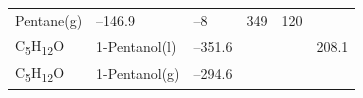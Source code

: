 \documentclass[
]{book}
\theoremstyle{definition}
\theoremstyle{definition}
\theoremstyle{definition}
\theoremstyle{remark}
\begin{document}
\begin{longtable}[]{@{}llllll@{}}
\begin{minipage}[t]{0.17\columnwidth}
Pentane(g)\strut
\end{minipage} & \begin{minipage}[t]{0.15\columnwidth}\raggedright
--146.9\strut
\end{minipage} & \begin{minipage}[t]{0.15\columnwidth}\raggedright
--8\strut
\end{minipage} & \begin{minipage}[t]{0.14\columnwidth}\raggedright
349\strut
\end{minipage} & \begin{minipage}[t]{0.14\columnwidth}\raggedright
120\strut
\end{minipage}\tabularnewline
\begin{minipage}[t]{0.07\columnwidth}\raggedright
C\textsubscript{5}H\textsubscript{12}O\strut
\end{minipage} & \begin{minipage}[t]{0.17\columnwidth}\raggedright
1-Pentanol(l)\strut
\end{minipage} & \begin{minipage}[t]{0.15\columnwidth}\raggedright
--351.6\strut
\end{minipage} & \begin{minipage}[t]{0.15\columnwidth}\raggedright
\strut
\end{minipage} & \begin{minipage}[t]{0.14\columnwidth}\raggedright
\strut
\end{minipage} & \begin{minipage}[t]{0.14\columnwidth}\raggedright
208.1\strut
\end{minipage}\tabularnewline
\begin{minipage}[t]{0.07\columnwidth}\raggedright
C\textsubscript{5}H\textsubscript{12}O\strut
\end{minipage} & \begin{minipage}[t]{0.17\columnwidth}\raggedright
1-Pentanol(g)\strut
\end{minipage} & \begin{minipage}[t]{0.15\columnwidth}\raggedright
--294.6\strut
\end{minipage} & \begin{minipage}[t]{0.15\columnwidth}\raggedright
\strut
\end{minipage} & \begin{minipage}[t]{0.14\columnwidth}\raggedright
\strut
\end{minipage} & \begin{minipage}[t]{0.14\columnwidth}\raggedright

\end{minipage}
\end{longtable}
\end{document}
